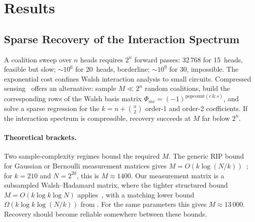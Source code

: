 \documentclass{article}
\begin{document}
\section{Results}
\label{sec:results}


%
%

\subsection{Sparse Recovery of the Interaction Spectrum}
\label{sec:sparse-walsh-recovery}

A coalition sweep over $n$ heads requires $2^n$ forward passes: 32\,768
for 15~heads, feasible but slow; ${\sim}10^6$ for 20~heads, borderline;
${\sim}10^9$ for 30, impossible. The exponential cost confines Walsh
interaction analysis to small circuits.  Compressed
sensing~\citep{candes2005decoding} offers an alternative: sample $M \ll 2^n$
random coalitions, build the corresponding rows of the Walsh basis matrix
$\Phi_{mc} = (-1)^{\mathrm{popcount}(c \,\&\, s)}$, and solve a sparse
regression for the $k = n + \binom{n}{2}$ order-1 and order-2 coefficients.
If the interaction spectrum is compressible, recovery succeeds at $M$
far below $2^n$.

\paragraph{Theoretical brackets.}

Two sample-complexity regimes bound the required $M$. The generic RIP
bound for Gaussian or Bernoulli measurement matrices gives
$M = O(k \log(N/k))$~\citep{candes2005decoding}; for $k=210$ and
$N = 2^{20}$, this is $M \approx 1400$. Our measurement matrix is a
subsampled Walsh--Hadamard matrix, where the tighter structured bound
$M = O(k \log k \log N)$ applies~\citep{bourgain2014,rudelson2008sparse},
with a matching lower bound $\Omega(k \log k \log(N/k))$ from
\citet{blasiok2019sparse}. For the same parameters this gives $M \approx 13\,000$.
Recovery should become reliable somewhere between these bounds.
\end{document}
